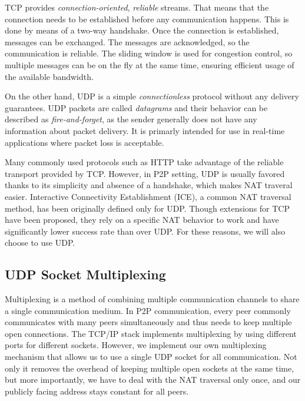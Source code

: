 TCP provides \textit{connection-oriented}, \textit{reliable} streams. That means that the connection needs to be established before any communication happens. This is done by means of a two-way handshake. Once the connection is established, messages can be exchanged. The messages are acknowledged, so the communication is reliable. The sliding window is used for congestion control, so multiple messages can be on the fly at the same time, ensuring efficient usage of the available bandwidth.

On the other hand, UDP is a simple \textit{connectionless} protocol without any delivery guarantees. UDP packets are called \textit{datagrams} and their behavior can be described as \textit{fire-and-forget}, as the sender generally does not have any information about packet delivery. It is primarly intended for use in real-time applications where packet loss is acceptable. %

Many commonly used protocols such as HTTP take advantage of the reliable transport provided by TCP. However, in P2P setting, UDP is usually favored thanks to its simplicity and absence of a handshake, which makes NAT traveral easier. Interactive Connectivity Establishment (ICE), a common NAT traversal method, has been originally defined only for UDP. Though extensions for TCP have been proposed, they rely on a specific NAT behavior to work and have significantly lower success rate than over UDP. For these reasons, we will also choose to use UDP.

\subsection{UDP Socket Multiplexing}

Multiplexing is a method of combining multiple communication channels to share a single communication medium. In P2P communication, every peer commonly communicates with many peers simultaneously and thus needs to keep multiple open connections. The TCP/IP stack implements multiplexing by using different ports for different sockets. However, we implement our own multiplexing mechanism that allows us to use a single UDP socket for all communication. Not only it removes the overhead of keeping multiple open sockets at the same time, but more importantly, we have to deal with the NAT traversal only once, and our publicly facing address stays constant for all peers.

